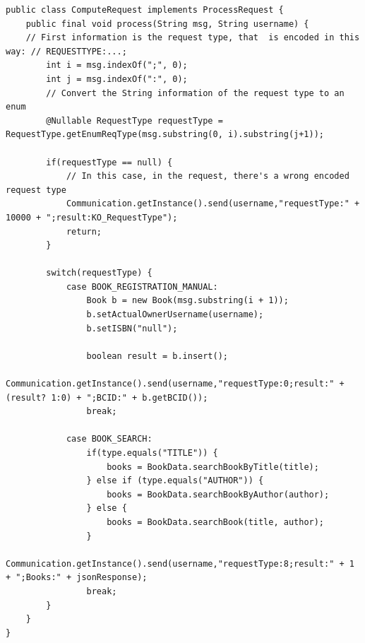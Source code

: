 \newpage
\begin{lstlisting}
public class ComputeRequest implements ProcessRequest { 
	public final void process(String msg, String username) {
	// First information is the request type, that  is encoded in this way: // REQUESTTYPE:...;
		int i = msg.indexOf(";", 0);
		int j = msg.indexOf(":", 0);
		// Convert the String information of the request type to an enum
		@Nullable RequestType requestType = RequestType.getEnumReqType(msg.substring(0, i).substring(j+1));

		if(requestType == null) {
			// In this case, in the request, there's a wrong encoded request type
			Communication.getInstance().send(username,"requestType:" + 10000 + ";result:KO_RequestType");
			return;
		}

		switch(requestType) {
			case BOOK_REGISTRATION_MANUAL:
				Book b = new Book(msg.substring(i + 1));
				b.setActualOwnerUsername(username);
				b.setISBN("null");

				boolean result = b.insert();
				Communication.getInstance().send(username,"requestType:0;result:" + (result? 1:0) + ";BCID:" + b.getBCID());
				break;
				
			case BOOK_SEARCH:
				if(type.equals("TITLE")) {
					books = BookData.searchBookByTitle(title);
				} else if (type.equals("AUTHOR")) {
					books = BookData.searchBookByAuthor(author);
				} else {
					books = BookData.searchBook(title, author);
				}
				Communication.getInstance().send(username,"requestType:8;result:" + 1 + ";Books:" + jsonResponse);
				break;
		}
	}
}
\end{lstlisting}